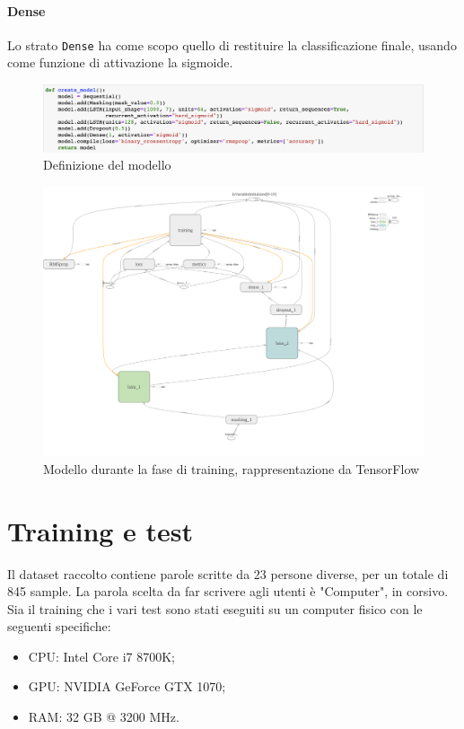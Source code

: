 \documentclass[8pt,notitlepage]{report}
\begin{document}
				\subsubsection{Dense}
					Lo strato \verb|Dense| ha come scopo quello di restituire la classificazione finale, usando come funzione di attivazione la sigmoide. 
			
	
			\begin{figure}
				\begin{center}
					\includegraphics[scale=.45]{def_model}
					\caption{Definizione del modello}
					\label{fig:model}
				\end{center}
			\end{figure}					
					
			\begin{figure}
				\begin{center}
					\includegraphics[scale=.23]{lstm_model}
					\caption{Modello durante la fase di training, rappresentazione da TensorFlow}
				\end{center}
			\end{figure}		
		


\chapter{Training e test}
	Il dataset raccolto contiene parole scritte da 23 persone diverse, per un totale di 845 sample. La parola scelta da far scrivere agli utenti è "Computer", in corsivo. \\
	Sia il training che i vari test sono stati eseguiti su un computer fisico con le seguenti specifiche:
	\begin{itemize}
		\item CPU: Intel Core i7 8700K;
		\item GPU: NVIDIA GeForce GTX 1070;
		\item RAM: 32 GB @ 3200 MHz.
	\end{itemize}
	
\end{document}
